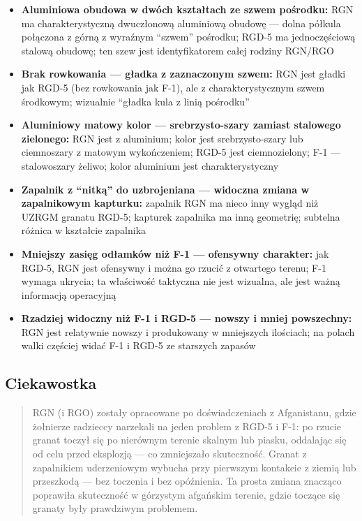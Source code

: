 \documentclass[12pt,oneside]{book}
\providecommand{\tightlist}{%
  \setlength{\itemsep}{0pt}\setlength{\parskip}{0pt}}
\begin{document}
\begin{itemize}
\tightlist
\item
  \textbf{Aluminiowa obudowa w dwóch kształtach ze szwem pośrodku:} RGN
  ma charakterystyczną dwuczłonową aluminiową obudowę --- dolna półkula
  połączona z górną z wyraźnym ``szwem'' pośrodku; RGD-5 ma
  jednoczęściową stalową obudowę; ten szew jest identyfikatorem całej
  rodziny RGN/RGO
\item
  \textbf{Brak rowkowania --- gładka z zaznaczonym szwem:} RGN jest
  gładki jak RGD-5 (bez rowkowania jak F-1), ale z charakterystycznym
  szwem środkowym; wizualnie ``gładka kula z linią pośrodku''
\item
  \textbf{Aluminiowy matowy kolor --- srebrzysto-szary zamiast stalowego
  zielonego:} RGN jest z aluminium; kolor jest srebrzysto-szary lub
  ciemnoszary z matowym wykończeniem; RGD-5 jest ciemnozielony; F-1 ---
  stalowoszary żeliwo; kolor aluminium jest charakterystyczny
\item
  \textbf{Zapalnik z ``nitką'' do uzbrojeniana --- widoczna zmiana w
  zapalnikowym kapturku:} zapalnik RGN ma nieco inny wygląd niż UZRGM
  granatu RGD-5; kapturek zapalnika ma inną geometrię; subtelna różnica
  w kształcie zapalnika
\item
  \textbf{Mniejszy zasięg odłamków niż F-1 --- ofensywny charakter:} jak
  RGD-5, RGN jest ofensywny i można go rzucić z otwartego terenu; F-1
  wymaga ukrycia; ta właściwość taktyczna nie jest wizualna, ale jest
  ważną informacją operacyjną
\item
  \textbf{Rzadziej widoczny niż F-1 i RGD-5 --- nowszy i mniej
  powszechny:} RGN jest relatywnie nowszy i produkowany w mniejszych
  ilościach; na polach walki częściej widać F-1 i RGD-5 ze starszych
  zapasów
\end{itemize}

\subsection{Ciekawostka}\label{ciekawostka-118}

\begin{quote}
RGN (i RGO) zostały opracowane po doświadczeniach z Afganistanu, gdzie
żołnierze radzieccy narzekali na jeden problem z RGD-5 i F-1: po rzucie
granat toczył się po nierównym terenie skalnym lub piasku, oddalając się
od celu przed eksplozją --- co zmniejszało skuteczność. Granat z
zapalnikiem uderzeniowym wybucha przy pierwszym kontakcie z ziemią lub
przeszkodą --- bez toczenia i bez opóźnienia. Ta prosta zmiana znacząco
poprawiła skuteczność w górzystym afgańskim terenie, gdzie toczące się
granaty były prawdziwym problemem.
\end{quote}
\end{document}
